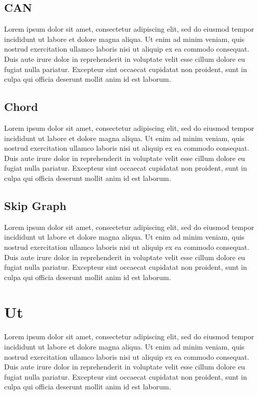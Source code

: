 \subsection{CAN}
  Lorem ipsum dolor sit amet, consectetur adipiscing elit, sed do eiusmod tempor
  incididunt ut labore et dolore magna aliqua. Ut enim ad minim veniam, quis
  nostrud exercitation ullamco laboris nisi ut aliquip ex ea commodo consequat.
  Duis aute irure dolor in reprehenderit in voluptate velit esse cillum dolore eu
  fugiat nulla pariatur. Excepteur sint occaecat cupidatat non proident, sunt in
  culpa qui officia deserunt mollit anim id est laborum.

\subsection{Chord}
  Lorem ipsum dolor sit amet, consectetur adipiscing elit, sed do eiusmod tempor
  incididunt ut labore et dolore magna aliqua. Ut enim ad minim veniam, quis
  nostrud exercitation ullamco laboris nisi ut aliquip ex ea commodo consequat.
  Duis aute irure dolor in reprehenderit in voluptate velit esse cillum dolore eu
  fugiat nulla pariatur. Excepteur sint occaecat cupidatat non proident, sunt in
  culpa qui officia deserunt mollit anim id est laborum.

\subsection{Skip Graph}
  Lorem ipsum dolor sit amet, consectetur adipiscing elit, sed do eiusmod tempor
  incididunt ut labore et dolore magna aliqua. Ut enim ad minim veniam, quis
  nostrud exercitation ullamco laboris nisi ut aliquip ex ea commodo consequat.
  Duis aute irure dolor in reprehenderit in voluptate velit esse cillum dolore eu
  fugiat nulla pariatur. Excepteur sint occaecat cupidatat non proident, sunt in
  culpa qui officia deserunt mollit anim id est laborum.

\section{Ut}
  Lorem ipsum dolor sit amet, consectetur adipiscing elit, sed do eiusmod tempor
  incididunt ut labore et dolore magna aliqua. Ut enim ad minim veniam, quis
  nostrud exercitation ullamco laboris nisi ut aliquip ex ea commodo consequat.
  Duis aute irure dolor in reprehenderit in voluptate velit esse cillum dolore eu
  fugiat nulla pariatur. Excepteur sint occaecat cupidatat non proident, sunt in
  culpa qui officia deserunt mollit anim id est laborum.


